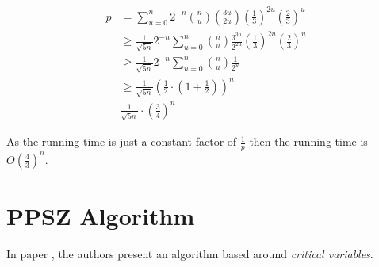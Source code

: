 \documentclass[12pt, a4paper]{article}
\theoremstyle{definition}
\begin{document}
\begin{align}
	p 	&= \sum_{u = 0}^{n} 2^{-n} \binom{n}{u} \binom{3u}{2u} \left( \frac{1}{3} \right)^{2u} \left( \frac{2}{3} \right)^u \\
	 	&\geq \frac{1}{\sqrt{5n}} 2^{-n}\sum_{u = 0}^{n} \binom{n}{u} \frac{3^{3u}}{2^{2u}} \left( \frac{1}{3} \right)^{2u} \left( \frac{2}{3} \right)^u \\
	 	&\geq \frac{1}{\sqrt{5n}} 2^{-n}\sum_{u = 0}^{n} \binom{n}{u} \frac{1}{2^u} \\
	 	&\geq \frac{1}{\sqrt{5n}} \left(\frac{1}{2} \cdot \left(1 + \frac{1}{2} \right) \right)^n \\
	 	& \frac{1}{\sqrt{5n}} \cdot \left( \frac{3}{4} \right)^n
\end{align}

As the running time is just a constant factor of $\frac{1}{p}$ then the running time is $O\left(\frac{4}{3} \right)^n$.
	




\section{PPSZ Algorithm}

In paper \cite{PaturiA98}, the authors present an algorithm based around \textit{critical variables}. 



\end{document}
